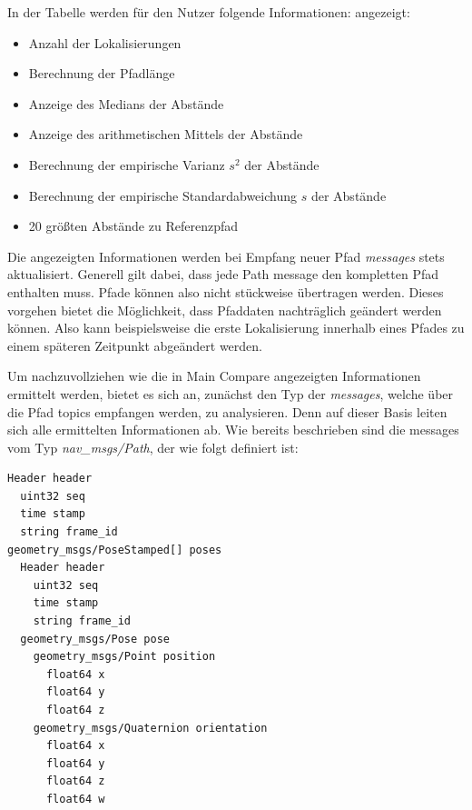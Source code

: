 In der Tabelle werden für den Nutzer folgende Informationen:
angezeigt:

\begin{itemize}
  \item Anzahl der Lokalisierungen
  \item Berechnung der Pfadlänge
  \item Anzeige des Medians der Abstände
  \item Anzeige des arithmetischen Mittels der Abstände
  \item Berechnung der empirische Varianz $s^2$ der Abstände
  \item Berechnung der empirische Standardabweichung $s$ der Abstände
  \item 20 größten Abstände zu Referenzpfad
\end{itemize}

Die angezeigten Informationen werden bei Empfang neuer Pfad \textit{messages} stets
aktualisiert. Generell gilt dabei, dass jede Path message den kompletten Pfad
enthalten muss. Pfade können also nicht stückweise übertragen werden. Dieses vorgehen
bietet die Möglichkeit, dass Pfaddaten nachträglich geändert werden können.
Also kann beispielsweise die erste Lokalisierung innerhalb eines Pfades zu einem
späteren Zeitpunkt abgeändert werden. 

Um nachzuvollziehen wie die in Main Compare angezeigten Informationen ermittelt werden, bietet
es sich an, zunächst den Typ der \textit{messages}, welche über die Pfad topics
empfangen werden, zu analysieren. Denn auf dieser Basis leiten sich alle
ermittelten Informationen ab. Wie bereits beschrieben sind die messages vom Typ
\textit{nav\_msgs/Path}, der wie folgt definiert ist:

\begin{lstlisting}[caption=ROS Path message, label=lst:pathmsgs]
Header header
  uint32 seq
  time stamp
  string frame_id
geometry_msgs/PoseStamped[] poses
  Header header
    uint32 seq
    time stamp
    string frame_id
  geometry_msgs/Pose pose
    geometry_msgs/Point position
      float64 x
      float64 y
      float64 z
    geometry_msgs/Quaternion orientation
      float64 x
      float64 y
      float64 z
      float64 w
\end{lstlisting}

